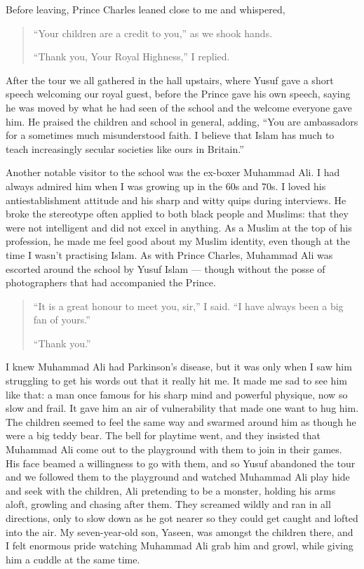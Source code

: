 \documentclass[12pt]{memoir}
\begin{document}
Before leaving, Prince Charles leaned close to me and whispered,

\begin{quote}
“Your children are a credit to you,” as we shook hands.

“Thank you, Your Royal Highness,” I replied.
\end{quote}

After the tour we all gathered in the hall upstairs,
where Yusuf gave a short speech welcoming our royal guest,
before the Prince gave his own speech,
saying he was moved by what he had seen of the school
and the welcome everyone gave him.
He praised the children and school in general, adding,
“You are ambassadors for a sometimes much misunderstood faith.
I believe that Islam has much to teach increasingly secular societies
like ours in Britain.”

Another notable visitor to the school was the ex-boxer Muhammad Ali.
I had always admired him when I was growing up in the 60s and 70s.
I loved his anti\–establishment attitude
and his sharp and witty quips during interviews.
He broke the stereotype often applied to both black people and Muslims:
that they were not intelligent and did not excel in anything.
As a Muslim at the top of his profession,
he made me feel good about my Muslim identity,
even though at the time I wasn’t practising Islam.
As with Prince Charles, Muhammad Ali was escorted around the school
by Yusuf Islam — though without the posse of photographers
that had accompanied the Prince.

\begin{quote}
“It is a great honour to meet you, sir,” I said.
“I have always been a big fan of yours.”

“Thank you.”
\end{quote}

I knew Muhammad Ali had Parkinson’s disease,
but it was only when I saw him struggling to get his words out
that it really hit me.
It made me sad to see him like that: a man once famous for his sharp mind
and powerful physique, now so slow and frail.
It gave him an air of vulnerability that made one want to hug him.
The children seemed to feel the same way and swarmed around him
as though he were a big teddy bear.
The bell for playtime went, and they insisted that Muhammad Ali
come out to the playground with them to join in their games.
His face beamed a willingness to go with them,
and so Yusuf abandoned the tour and we followed them to the playground
and watched Muhammad Ali play hide and seek with the children,
Ali pretending to be a monster, holding his arms aloft,
growling and chasing after them.
They screamed wildly and ran in all directions, only to slow down
as he got nearer so they could get caught and lofted into the air.
My seven-year-old son, Yaseen, was amongst the children there,
and I felt enormous pride watching Muhammad Ali grab him and growl,
while giving him a cuddle at the same time.
\end{document}
